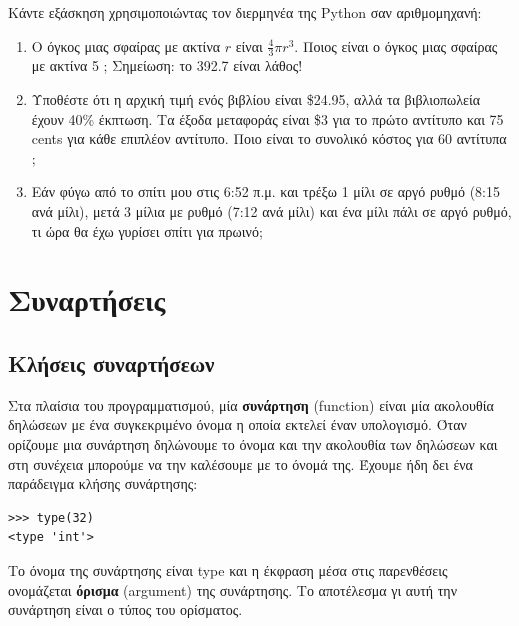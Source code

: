 \documentclass[10pt]{book}
\begin{document}
\begin{exercise}
Κάντε εξάσκηση χρησιμοποιώντας τον διερμηνέα της  Python  σαν
αριθμομηχανή:

\begin{enumerate}

\item Ο όγκος μιας σφαίρας με ακτίνα $r$ είναι $\frac{4}{3} \pi r^3$.  
	Ποιος είναι ο όγκος μιας σφαίρας με ακτίνα 5 ;  Σημείωση: το 392.7 είναι λάθος!

\item  Υποθέστε ότι η αρχική τιμή ενός βιβλίου είναι \$24.95,  αλλά τα
	βιβλιοπωλεία έχουν 40\% έκπτωση.  Τα έξοδα μεταφοράς είναι \$3 για το πρώτο
	αντίτυπο και 75  cents  για κάθε επιπλέον αντίτυπο.  Ποιο είναι το συνολικό
	κόστος για 60 αντίτυπα ;  


\item Εάν φύγω από το σπίτι μου στις 6:52 π.μ. και τρέξω 1 μίλι σε
	αργό ρυθμό (8:15 ανά μίλι), μετά 3 μίλια με ρυθμό (7:12 ανά μίλι) και ένα
	μίλι πάλι σε αργό ρυθμό, τι ώρα θα έχω γυρίσει σπίτι για πρωινό; 

\end{enumerate}
\end{exercise}


\chapter{Συναρτήσεις}
\label{funcchap}

\section{Κλήσεις συναρτήσεων}
\label{functionchap}

Στα πλαίσια του προγραμματισμού, μία {\bf συνάρτηση} (function) είναι μία ακολουθία δηλώσεων με ένα συγκεκριμένο όνομα η οποία εκτελεί έναν υπολογισμό. Όταν ορίζουμε μια συνάρτηση δηλώνουμε το όνομα και την ακολουθία των δηλώσεων και στη συνέχεια μπορούμε να την καλέσουμε με το όνομά της. Έχουμε ήδη δει ένα παράδειγμα κλήσης συνάρτησης:

\begin{verbatim}
>>> type(32)
<type 'int'>
\end{verbatim}
%

Το όνομα της συνάρτησης είναι type και η έκφραση μέσα στις παρενθέσεις
ονομάζεται {\bf όρισμα} (argument) της συνάρτησης. Το αποτέλεσμα γι αυτή την συνάρτηση είναι ο τύπος του ορίσματος.
\end{document}
